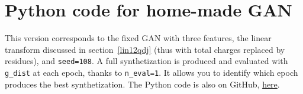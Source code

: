 \documentclass[oneside,10pt]{book}
\begin{document}
\section{Python code for home-made GAN}

This version corresponds to the fixed GAN with three features, the linear transform discussed in section~\ref{lin12qdj} (thus with total charges replaced by residues), and \texttt{seed=108}. A full synthetization is produced and evaluated with
 \texttt{g\_dist} at each epoch, 
 thanks to \texttt{n\_eval=1}. It allows you to identify which epoch produces the best synthetization. 
 The Python code is also on GitHub, \href{https://github.com/VincentGranville/Main/blob/main/GAN_telecom.py}{here}. \vspace{1ex}






\end{document}
